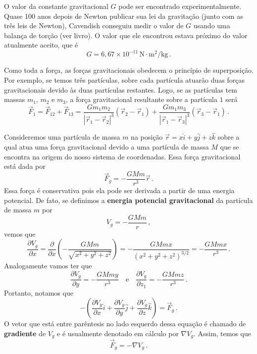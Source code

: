 \documentclass[12pt,a4paper]{article}
\newcommand{\dpar}[1]{\left(#1\right)}
\theoremstyle{definition}
\begin{document}
O valor da constante gravitacional $G$ pode ser encontrado
experimentalmente. Quase 100 anos depois de Newton publicar sua lei da
gravitação (junto com as três leis de Newton), Cavendish conseguiu
medir o valor de $G$ usando uma balança de torção (ver livro). O valor
que ele encontrou estava próximo do valor atualmente aceito, que é
$$G=6{,}67\times 10^{-11}\,\mathrm{N}\cdot\mathrm{m}^2/\mathrm{kg}\,.$$

Como toda a força, as forças gravitacionais obedecem o princípio de
superposição. Por exemplo, se temos três partículas, sobre cada
partícula atuarão duas forças gravitacionais devido às duas partículas
restantes. Logo, se as partículas tem massas $m_1$, $m_2$ e $m_3$, a
força gravitacional resultante sobre a partícula $1$ será
\begin{equation*}
  \vec F_1=\vec F_{12}+\vec F_{13}=\frac{Gm_1m_2}{|\vec r_1-\vec r_2|^3}(\vec r_2-\vec
    r_1)+\frac{Gm_1m_3}{|\vec r_1-\vec r_3|^3}(\vec r_3-\vec r_1)\,.
\end{equation*}

Consideremos uma partícula de massa $m$ na posição
$\vec r=x\hat i+y\hat j+z\hat k$ sobre a qual atua uma força
gravitacional devido a uma partícula de massa $M$ que se encontra na
origem do nosso sistema de coordenadas. Essa força gravitacional está
dada por
$$\vec F_g=-\frac{GMm}{r^3}\vec r\,.$$
Essa força é conservativa pois ela pode ser derivada a partir de uma
energia potencial. De fato, se definimos a \textbf{energia potencial
  gravitacional} da partícula de massa $m$ por
\begin{equation}
  \label{eq:10}
  V_g=-\frac{GMm}{r}\,,
\end{equation}
vemos que
\begin{equation*}
  \frac{\partial V_g}{\partial x}=\frac{\partial}{\partial x}\dpar{-\frac{GMm}{\sqrt{x^2+y^2+z^2}}}=-\frac{GMmx}{(x^2+y^2+z^2)^{3/2}}=-\frac{GMmx}{r^3}\,.
\end{equation*}
Analogamente vamos ter que
$$\frac{\partial V_g}{\partial y}=-\frac{GMmy}{r^3}\quad\text{e}\quad\frac{\partial V_g}{\partial z_1}=-\frac{GMmz}{r^3}\,.$$
Portanto, notamos que
$$-\dpar{\frac{\partial V_g}{\partial x}\hat i+\frac{\partial V_g}{\partial y}\hat j+\frac{\partial V_g}{\partial z}\hat k}=\vec F_g\,.$$
O vetor que está entre parêntesis no lado esquerdo dessa equação é
chamado de \textbf{gradiente} de $V_g$ e é usualmente denotado em
cálculo por $\nabla V_g$. Assim, temos que
\begin{equation}
  \label{eq:11}
  \vec F_g=-\nabla V_g\,.
\end{equation}
\end{document}
